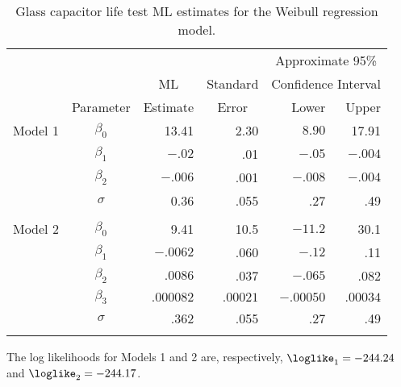 \begin{table}
\caption{Glass capacitor life test ML estimates for 
the Weibull regression model.}
\centering\small
\begin{tabular}{lcrrrr} 
\\[-.5ex]
\hline
& & & & \multicolumn{2}{c}{Approximate 95\%}\\
&&\multicolumn{1}{c}{ML} &Standard & \multicolumn{2}{c}{Confidence
Interval}\\ \cline{5-6}
& Parameter & Estimate&
\multicolumn{1}{c}{Error} & Lower & Upper \\
\hline 
Model 1 
&$\beta_{0}$ &13.41 &2.30 &$8.90$ &17.91 \\[.7ex] 
&$\beta_{1}$ &$-.02$  &.01  & $-.05$  & $-.004$\\[.7ex] 
&$\beta_{2}$ &$-.006$  &.001 &$-.008$ &$-.004$ \\[.7ex] 
&$\sigma$ &0.36 &.055 &.27 & .49 \\[1.2ex]
\hline 
\\[-1.8ex]
Model 2 
&$\beta_{0}$ &9.41 &10.5 &$-11.2$ &30.1 \\[.7ex] 
&$\beta_{1}$ & $-.0062$ &.060 &$-.12$ &.11 \\[.7ex] 
&$\beta_{2}$ &$.0086$ &.037 & $-.065$ &.082 \\[.7ex] 
&$\beta_{3}$ &$.000082$ &$.00021$ & $-.00050$ &$.00034$ \\[.7ex] 
&$\sigma$ &.362 &.055 &.27 &.49 \\[1.2ex]
\hline 
\\[-1.8ex]
\end{tabular}
\begin{minipage}[t]{4in}
The log likelihoods for Models 1 and 2 are, respectively, $\loglike_{1}=-244.24 $
and $\loglike_{2}=-244.17 $.
\end{minipage}
\label{table:zelen.mles}
\end{table}


